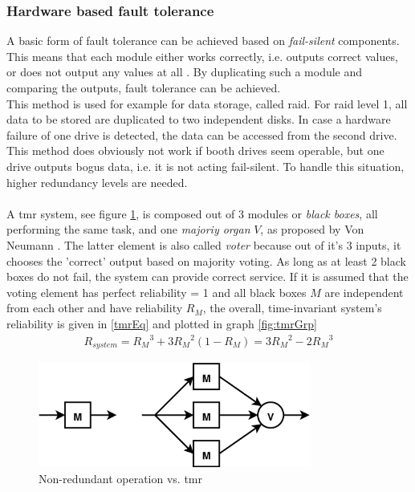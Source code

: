 \subsubsection{Hardware based fault tolerance}
A basic form of fault tolerance can be achieved based on \textit{fail-silent} components. This means that each
module either works correctly, i.e. outputs correct values, or does not output any values at all \cite{544479}. By duplicating such a module and comparing the
outputs, fault tolerance can be achieved.
\\
This method is used for example for data storage, called \gls{raid}.
For \gls{raid} level 1, all data to be stored are duplicated to two independent disks. In case a hardware failure of one drive is detected, the data can be accessed
from the second drive. This method does obviously not work if booth drives seem operable, but one drive outputs bogus data, i.e. it is not acting fail-silent.
To handle this situation, higher redundancy levels are needed.
\\
\\
A \gls{tmr} system, see figure \ref{fig:tmr}, is composed out of 3 modules or \textit{black boxes}, all performing the same task,	
and one \textit{majoriy organ} $V$, as proposed by Von Neumann \cite{vN56}. The latter element
is also called \textit{voter} because out of it's 3 inputs, it chooses the 'correct' output based on majority voting. As long as at least 2 black boxes do not
fail, the system can provide correct service. If it is assumed that the voting element has perfect reliability = 1 and all black boxes $M$ are independent from
each other and have reliability $R_M$, the overall, time-invariant system's reliability is given in \ref{tmrEq} \cite{Lyons:1962:UTR:1661979.1661984} and plotted in graph \ref{fig:tmrGrp}
\begin{align}\label{tmrEq}
 R_{system} = {R_M}^3 + 3{R_M}^2(1-R_M) = 3{R_M}^2 - 2{R_M}^3
\end{align}
\begin{figure}
    \centering
    \includegraphics[width=0.8\textwidth]{figures/tmr.eps}
    \caption{Non-redundant operation vs. \gls{tmr}}
    \label{fig:tmr}
\end{figure}
